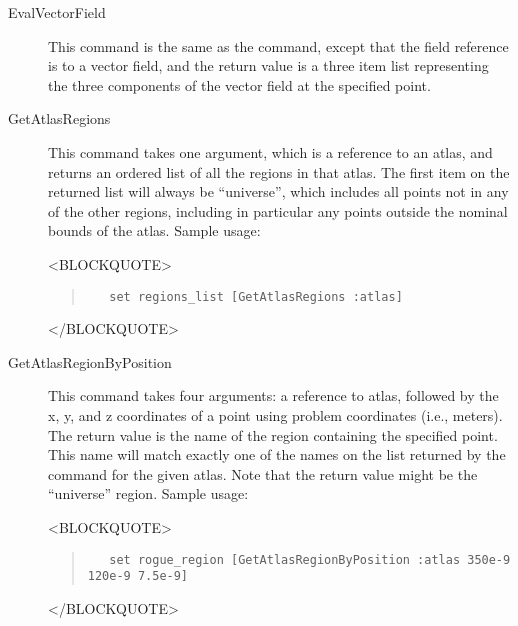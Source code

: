 \begin{description}
\item[EvalVectorField\label{html:mif2EvalVectorField}]
This command is the same as the  command, except
that the field reference is to a vector field, and the return value is a
three item list representing the three components of the vector field at
the specified point.

\item[GetAtlasRegions\label{html:mif2GetAtlasRegions}]
This command takes one argument, which is a reference to an atlas, and
returns an ordered list of all the regions in that atlas.  The first
item on the returned list will always be ``universe'', which includes
all points not in any of the other regions, including in particular any
points outside the nominal bounds of the atlas.  Sample usage:
\begin{rawhtml}
<BLOCKQUOTE>
\end{rawhtml}
\begin{quote}
\begin{verbatim}
   set regions_list [GetAtlasRegions :atlas]
\end{verbatim}
\end{quote}
\begin{rawhtml}
</BLOCKQUOTE>
\end{rawhtml}


\item[GetAtlasRegionByPosition\label{html:mif2GetAtlasRegionByPosition}]
This command takes four arguments: a reference to atlas, followed by the
x, y, and z coordinates of a point using problem coordinates (i.e.,
meters).  The return value is the name of the region containing the
specified point.  This name will match exactly one of the names on the
list returned by the  command for the given atlas.
Note that the return value might be the ``universe'' region.  Sample
usage:
\begin{rawhtml}
<BLOCKQUOTE>
\end{rawhtml}
\begin{quote}
\begin{verbatim}
   set rogue_region [GetAtlasRegionByPosition :atlas 350e-9 120e-9 7.5e-9]
\end{verbatim}
\end{quote}
\begin{rawhtml}
</BLOCKQUOTE>
\end{rawhtml}


\end{description}

